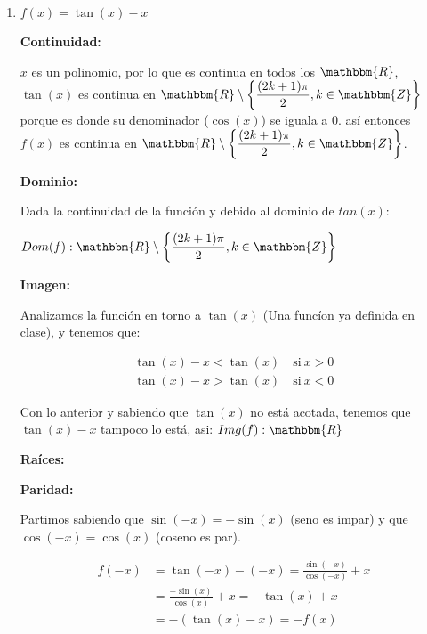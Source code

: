 \documentclass[12pt]{article}
\begin{document}
\begin{enumerate}[\hspace{9px} a)]
    \item \(f(x)=\tan(x)-x\)\bigskip
    
        \textbf{Continuidad: }\medskip

            $x$ es un polinomio, por lo que es continua en todos los $\mathbbm{R}$, \(\tan(x)\) es continua en \(\mathbbm{R}\setminus\displaystyle\left\{\frac{(2k+1)\pi}{2}, k\in\mathbbm{Z}\right\}\) porque es donde su denominador (\(\cos(x)\)) se iguala a 0. as\'i entonces \(f(x)\) es continua en \(\mathbbm{R}\setminus\displaystyle\left\{\frac{(2k+1)\pi}{2}, k\in\mathbbm{Z}\right\}\).\bigskip
        
        \textbf{Dominio: }\medskip
            
            Dada la continuidad de la funci\'on y debido al dominio de \(tan(x)\):\medskip

            \(Dom(f):\mathbbm{R}\setminus\displaystyle\left\{\frac{(2k+1)\pi}{2}, k\in\mathbbm{Z}\right\}\)\bigskip

        \textbf{Imagen: }\medskip

            Analizamos la funci\'on en torno a $\tan(x)$ (Una func\'ion ya definida en clase), y tenemos que:

            \begin{align*}
                \tan(x)-x<\tan(x) \quad \text{si} \ x>0\\
                \tan(x)-x>\tan(x) \quad \text{si} \ x<0
            \end{align*}

            Con lo anterior y sabiendo que \(\tan(x)\) no est\'a acotada, tenemos que \(\tan(x)-x\) tampoco lo est\'a, asi: \(Img(f): \mathbbm{R}\)\bigskip

        \textbf{Ra\'ices: }\medskip

        \textbf{Paridad: }\medskip

            Partimos sabiendo que \(\sin(-x)=-\sin(x)\) (seno es impar) y que \(\cos(-x)=\cos(x)\) (coseno es par).

            \begin{align*}
                f(-x)&=\tan(-x)-(-x)=\frac{\sin(-x)}{\cos(-x)}+x \\
                &= \frac{-\sin(x)}{\cos(x)}+x = -\tan(x)+x \\
                &= -(\tan(x)-x)= -f(x)
            \end{align*}


\end{enumerate}
\end{document}
